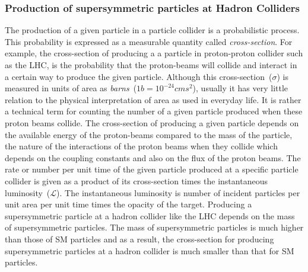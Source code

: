{\subsubsection{Production of supersymmetric particles at Hadron Colliders}
The production of a given particle in a particle collider is a probabilistic process.
This probability is expressed as a measurable quantity called \textit{cross-section}. For example,
the cross-section of producing a a particle in proton-proton collider such as the LHC, is the probability 
that the proton-beams will collide and interact in a certain way to produce the given particle. Although this
cross-section~($\sigma$) is measured in units of area as \textit{barns}~($1b = 10^{-24}cms^{2}$), usually it has 
very little relation to the physical interpretation of area as used in everyday life. It is rather a technical
term for counting the number of a given particle produced when these proton beams collide.
The cross-section of producing a given particle depends on the available energy of the 
proton-beams compared to the mass of the particle, the nature of the interactions of the proton beams 
when they collide which depends on the coupling constants and also on the flux of the proton beams.
The rate or number per unit time of the given particle produced at a specific particle collider is
given as a product of its cross-section times the instantaneous luminosity~($\mathscr{L}$).
The instantaneous luminosity is number of incident particles per unit area per unit time 
times the opacity of the target.
\newline
Producing a supersymmetric particle at a hadron collider like the LHC depends on the mass of supersymmetric particles. 
The mass of supersymmetric particles is much higher than those of SM particles and as a result, the cross-section for producing supersymmetric particles at a hadron collider is much smaller than that for SM particles.
}
